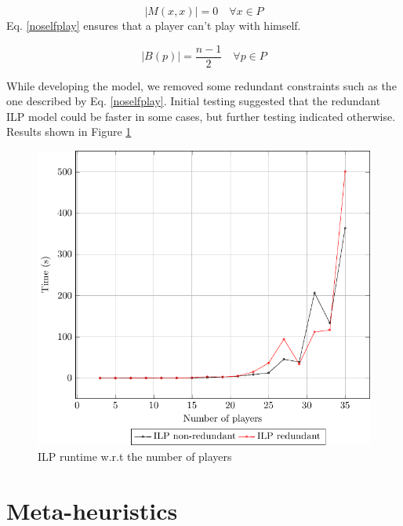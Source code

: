 \documentclass[a4paper, 10pt]{article}
\begin{document}
\begin{minipage}{0.45\linewidth}
\begin{equation}
    \label{noselfplay}
    |M(x,x)| = 0 \quad \forall x \in P 
\end{equation}
Eq. \ref{noselfplay} ensures that a player can't play with himself. 

\begin{equation}
    \label{blackfairness}
    |B(p)| = \frac{n-1}{2} \quad \forall p \in P
\end{equation}

    While developing the model, we removed some redundant constraints such as the one described by Eq. \ref{noselfplay}. Initial testing suggested that the redundant ILP model could be faster in some cases, but further testing indicated otherwise. Results shown in Figure \ref{figilp}
\end{minipage}
\begin{minipage}{0.49\linewidth}
\begin{figure}[H]
    \centering
    \includegraphics[width=\linewidth]{plots/time_per_instance.pdf}
    \caption{ILP runtime w.r.t the number of players}
    \label{figilp}
\end{figure}
\end{minipage}


\clearpage

\section{Meta-heuristics}
\end{document}
